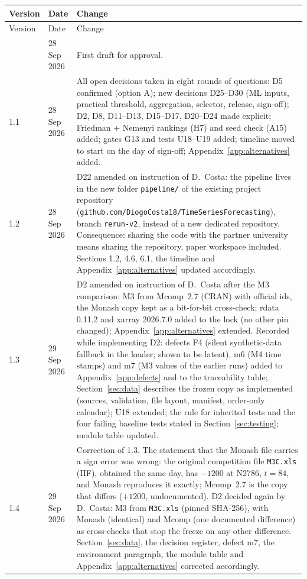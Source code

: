 \documentclass[11pt,a4paper]{article}
\newcommand{\code}[1]{\texttt{#1}}
\begin{document}
\begin{longtable}{@{}p{1.3cm} p{1.9cm} p{11.8cm}@{}}
\toprule
Version & Date & Change \\
\midrule
\endfirsthead
\toprule
Version & Date & Change \\
\midrule
\endhead
\bottomrule
\endfoot
1.0 & 28 Sep 2026 & First draft for approval. \\
1.1 & 28 Sep 2026 & All open decisions taken in eight rounds of questions: D5 confirmed (option A); new decisions D25--D30 (ML inputs, practical threshold, aggregation, selector, release, sign-off); D2, D8, D11--D13, D15--D17, D20--D24 made explicit; Friedman + Nemenyi rankings (H7) and seed check (A15) added; gates G13 and tests U18--U19 added; timeline moved to start on the day of sign-off; Appendix~\ref{app:alternatives} added. \\
1.2 & 28 Sep 2026 & D22 amended on instruction of D.\ Costa: the pipeline lives in the new folder \code{pipeline/} of the existing project repository (\code{github.com/DiogoCosta18/TimeSeriesForecasting}), branch \code{rerun-v2}, instead of a new dedicated repository. Consequence: sharing the code with the partner university means sharing the repository, paper workspace included. Sections 1.2, 4.6, 6.1, the timeline and Appendix~\ref{app:alternatives} updated accordingly. \\
1.3 & 29 Sep 2026 & D2 amended on instruction of D.\ Costa after the M3 comparison: M3 from Mcomp~2.7 (CRAN) with official ids, the Monash copy kept as a bit-for-bit cross-check; rdata 0.11.2 and xarray 2026.7.0 added to the lock (no other pin changed); Appendix~\ref{app:alternatives} extended. Recorded while implementing D2: defects F4 (silent synthetic-data fallback in the loader; shown to be latent), m6 (M4 time stamps) and m7 (M3 values of the earlier runs) added to Appendix~\ref{app:defects} and to the traceability table; Section~\ref{sec:data} describes the frozen copy as implemented (sources, validation, file layout, manifest, order-only calendar); U18 extended; the rule for inherited tests and the four failing baseline tests stated in Section~\ref{sec:testing}; module table updated. \\
1.4 & 29 Sep 2026 & Correction of 1.3. The statement that the Monash file carries a sign error was wrong: the original competition file \code{M3C.xls} (IIF), obtained the same day, has $-1200$ at N2786, $t=84$, and Monash reproduces it exactly; Mcomp~2.7 is the copy that differs ($+1200$, undocumented). D2 decided again by D.\ Costa: M3 from \code{M3C.xls} (pinned SHA-256), with Monash (identical) and Mcomp (one documented difference) as cross-checks that stop the freeze on any other difference. Section~\ref{sec:data}, the decision register, defect m7, the environment paragraph, the module table and Appendix~\ref{app:alternatives} corrected accordingly. \\

\end{longtable}
\end{document}
